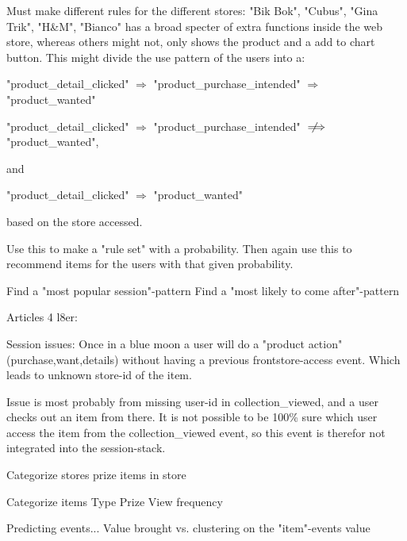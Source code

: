 Must make different rules for the different stores:
"Bik Bok", "Cubus", "Gina Trik", "H\&M", "Bianco" has a broad specter of extra
functions inside the web store, whereas others might not, only shows the
product and a add to chart button.  This might divide the use pattern of the
users into a:

"product\_detail\_clicked" $\Rightarrow$ "product\_purchase\_intended" $\Rightarrow$ "product\_wanted"

"product\_detail\_clicked" $\Rightarrow$ "product\_purchase\_intended" $\notimplies$ "product\_wanted",

and

"product\_detail\_clicked" $\Rightarrow$ "product\_wanted"

based on the store accessed.

Use this to make a "rule set" with a probability.
Then again use this to recommend items for the users with that given
probability.

Find a "most popular session"-pattern
Find a "most likely to come after"-pattern


Articles 4 l8er:

Session issues:
Once in a blue moon a user will do a "product action" (purchase,want,details)
without having a previous frontstore-access event. Which leads to unknown
store-id of the item.

Issue is most probably from missing user-id in collection\_viewed, and a user
checks out an item from there. It is not possible to be 100\% sure which user
access the item from the collection\_viewed event, so this event is therefor
not integrated into the session-stack.


Categorize stores
    prize
    items in store

Categorize items
    Type
    Prize
    View frequency

Predicting events...
    Value brought vs. clustering on the "item"-events value

